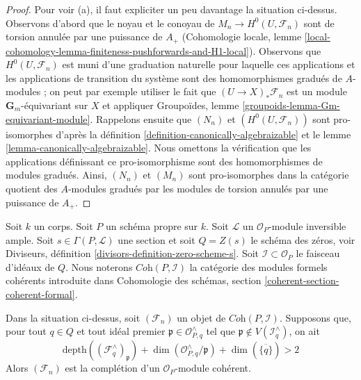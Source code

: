 \begin{proof}
\medskip\noindent
Pour voir (a), il faut expliciter un peu davantage la situation ci-dessus.
Observons d'abord que le noyau et le conoyau de $M_n \to H^0(U, \mathcal{F}_n)$
sont de torsion annulée par une puissance de $A_+$ (Cohomologie locale, lemme
\ref{local-cohomology-lemma-finiteness-pushforwards-and-H1-local}).
Observons que $H^0(U, \mathcal{F}_n)$ est muni d'une graduation naturelle
pour laquelle ces applications et les applications de transition du système sont
des homomorphismes gradués de $A$-modules ; on peut par exemple utiliser le fait que
$(U \to X)_*\mathcal{F}_n$ est un module $\mathbf{G}_m$-équivariant
sur $X$ et appliquer 
Groupoïdes, lemme \ref{groupoids-lemma-Gm-equivariant-module}.
Rappelons ensuite que $(N_n)$ et $(H^0(U, \mathcal{F}_n))$
sont pro-isomorphes d'après la définition \ref{definition-canonically-algebraizable}
et le lemme \ref{lemma-canonically-algebraizable}.
Nous omettons la vérification que les applications définissant ce
pro-isomorphisme sont des homomorphismes de modules gradués.
Ainsi, $(N_n)$ et $(M_n)$ sont pro-isomorphes dans la catégorie quotient des
$A$-modules gradués par les modules de torsion annulés par une puissance de $A_+$.
\end{proof}

\noindent
Soit $k$ un corps. Soit $P$ un schéma propre sur $k$.
Soit $\mathcal{L}$ un $\mathcal{O}_P$-module inversible ample.
Soit $s \in \Gamma(P, \mathcal{L})$ une section et soit
$Q = Z(s)$ le schéma des zéros, voir
Diviseurs, définition \ref{divisors-definition-zero-scheme-s}.
Soit $\mathcal{I} \subset \mathcal{O}_P$ le faisceau d'idéaux de $Q$.
Nous noterons $\textit{Coh}(P, \mathcal{I})$ la catégorie
des modules formels cohérents introduite dans
Cohomologie des schémas, section \ref{coherent-section-coherent-formal}.

\begin{proposition}
\label{proposition-lefschetz-existence}
Dans la situation ci-dessus, soit $(\mathcal{F}_n)$ un objet de
$\textit{Coh}(P, \mathcal{I})$. Supposons que, pour tout $q \in Q$ et tout
idéal premier $\mathfrak p \in \mathcal{O}_{P, q}^\wedge$ tel que
$\mathfrak p \not \in V(\mathcal{I}_q^\wedge)$, on ait
$$
\text{depth}((\mathcal{F}_q^\wedge)_\mathfrak p) +
\dim(\mathcal{O}_{P, q}^\wedge/\mathfrak p) +
\dim(\overline{\{q\}}) > 2
$$
Alors $(\mathcal{F}_n)$ est la complétion d'un
$\mathcal{O}_P$-module cohérent.
\end{proposition}

